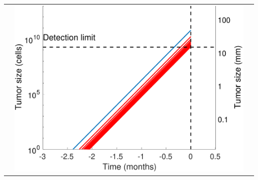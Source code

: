 \begin{tabular}{ccc}
&
\includegraphics[width=\coll]{simulations/patient_30/growth_mets.pdf}
\end{tabular}
